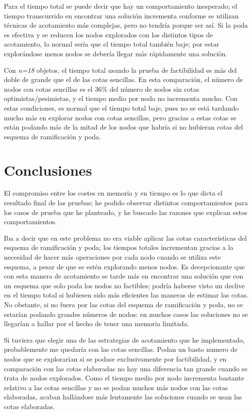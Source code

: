 \documentclass[12pt , a4paper]{article}
\begin{document}
Para el tiempo total se puede decir que hay un comportamiento inesperado; el tiempo transcurrido en encontrar una solución incrementa conforme se utilizan técnicas de acotamiento más complejas, pero no tendría porque ser así. Si la poda es efectiva y se reducen los nodos explorados con los distintos tipos de acotamiento, lo normal sería que el tiempo total también baje; por estar explorándose menos nodos se debería llegar más rápidamente una solución. 


Con \textit{n=18} objetos, el tiempo total usando la prueba de factibilidad es más del doble de grande que el de las cotas sencillas. En esta comparación, el número de nodos con cotas sencillas es el 36\% del número de nodos sin cotas optimistas/pesimistas, y el tiempo medio por nodo no incrementa mucho. Con estas condiciones, es normal que el tiempo total baje, pues no se está tardando mucho más en explorar nodos con cotas sencillas, pero gracias a estas cotas se están podando más de la mitad de los nodos que habría si no hubieran cotas del esquema de ramificación y poda.

\newpage
\section{Conclusiones}

El compromiso entre los costes en memoria y en tiempo es lo que dicta el resultado final de las pruebas; he podido observar distintos comportamientos para los casos de prueba que he planteado, y he buscado las razones que explican estos comportamientos.

Iba a decir que en este problema no era viable aplicar las cotas características del esquema de ramificación y poda; los tiempos totales incrementan gracias a la necesidad de hacer más operaciones por cada nodo cuando se utiliza este esquema, a pesar de que se estén explorando menos nodos. Es decepcionante que con esta manera de acotamiento se tarde más en encontrar una solución que con un esquema que solo poda los nodos no factibles; podría haberse visto un declive en el tiempo total si hubiesen sido más eficientes las maneras de estimar las cotas. No obstante, si no fuera por las cotas del esquema de ramificación y poda, no se estarían podando grandes números de nodos: en muchos casos las soluciones no se llegarían a hallar por el hecho de tener una memoria limitada. 

Si tuviera que elegir una de las estrategias de acotamiento que he implementado, probablemente me quedaría con las cotas sencillas. Podan un basto numero de nodos que se explorarían si se podase exclusivamente por factibilidad, y en comparación con las cotas elaboradas no hay una diferencia tan grande cuando se trata de nodos explorados. Como el tiempo medio por nodo incrementa bastante relativo a las cotas sencillas y no se podan muchos más nodos con las cotas elaboradas, acaban hallándose más lentamente las soluciones cuando se usan las cotas elaboradas.
\end{document}
